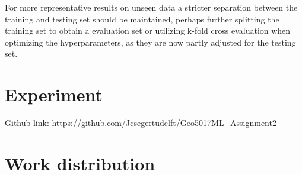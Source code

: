 \documentclass[a4paper,11pt]{scrartcl}
\begin{document}
For more representative results on unseen data a stricter separation between the training and testing set should be maintained, perhaps further splitting the training set to obtain a evaluation set or utilizing k-fold cross evaluation when optimizing the hyperparameters, as they are now partly adjusted for the testing set.

\section{Experiment}
Github link: \url{https://github.com/Jcsegertudelft/Geo5017ML_Assignment2}

\section{Work distribution}
\begin{table}[H]
    \centering
    \label{tab:placeholder}
\end{table}


\end{document}
